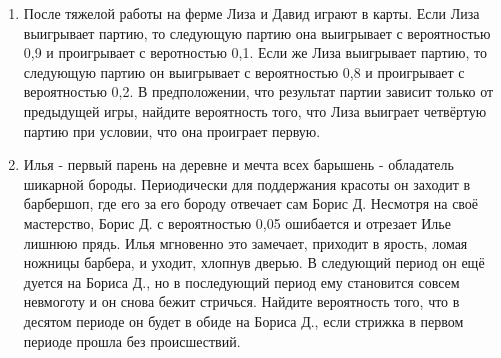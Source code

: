 \documentclass[11pt, a4paper]{article}
\theoremstyle{definition}
\begin{document}
\begin{enumerate}
\begin{enumerate}
    \item После тяжелой работы на ферме Лиза и Давид играют в карты. Если Лиза выигрывает партию, то следующую партию она выигрывает с вероятностью 0,9 и проигрывает с веротностью 0,1. Если же Лиза выигрывает партию, то следующую партию он выигрывает с вероятностью 0,8 и проигрывает с вероятностью 0,2. В предположении, что результат партии зависит только от предыдущей игры, найдите вероятность того, что Лиза выиграет четвёртую партию при условии, что она проиграет первую.
    \item Илья - первый парень на деревне и мечта всех барышень - обладатель шикарной бороды. Периодически для поддержания красоты он заходит в барбершоп, где его за его бороду отвечает сам Борис Д. Несмотря на своё мастерство, Борис Д. с вероятностью 0,05 ошибается и отрезает Илье лишнюю прядь. Илья мгновенно это замечает, приходит в ярость, ломая ножницы барбера, и уходит, хлопнув дверью. В следующий период он ещё дуется на Бориса Д., но в последующий период ему становится совсем невмоготу и он снова бежит стричься. Найдите вероятность того, что в десятом периоде он будет в обиде на Бориса Д., если стрижка в первом периоде прошла без происшествий.
\end{enumerate}    
    
    
\end{enumerate}

\newpage
\end{document}

